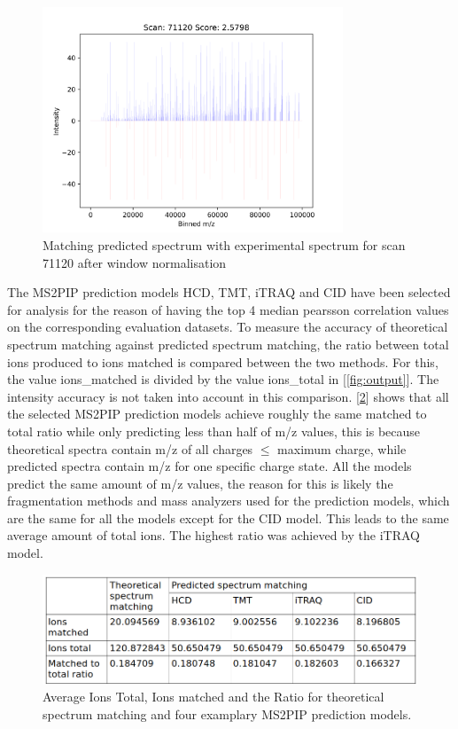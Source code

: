 \documentclass[11pt]{article}
\begin{document}
\begin{figure}[ht]
\centering
\includegraphics[width=0.8\textwidth]{figs/scan_71120_ps=True_wins.png}
\caption{Matching predicted spectrum with experimental spectrum for scan 71120 after window normalisation}
\label{fig:scanwin}
\end{figure}

The MS2PIP prediction models HCD, TMT, iTRAQ and CID have been selected for analysis for the reason of having the top 4 median pearsson correlation values on the corresponding evaluation datasets.
To measure the accuracy of theoretical spectrum matching against predicted spectrum matching, the ratio between total ions produced to ions matched is compared between the two methods. For this, the value ions\_matched is divided by the value ions\_total in [\cref{fig:output}]. The intensity accuracy is not taken into account in this comparison. [\cref{fig:ratio_table}] shows that all the selected MS2PIP prediction models achieve roughly the same matched to total ratio while only predicting less than half of m/z values, this is because theoretical spectra contain m/z of all charges $\le$ maximum charge, while predicted spectra contain m/z for one specific charge state. All the models predict the same amount of m/z values, the reason for this is likely the fragmentation methods and mass analyzers used for the prediction models, which are the same for all the models except for the CID model. This leads to the same average amount of total ions. The highest ratio was achieved by the iTRAQ model.

\begin{figure}[ht]
\centering
\includegraphics[width=1\textwidth]{figs/ratio_table.png}
\caption{Average Ions Total, Ions matched and the Ratio for theoretical spectrum matching and four examplary MS2PIP prediction models.}
\label{fig:ratio_table}
\end{figure}
\end{document}
